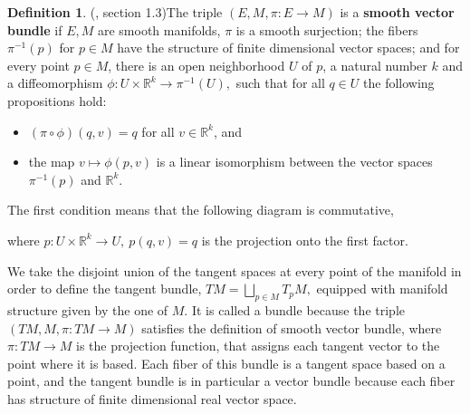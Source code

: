 \documentclass[12pt, letterpaper, reqno]{amsart}
\theoremstyle{definition}
\newtheorem{df}{Definition}
\theoremstyle{plain}
\theoremstyle{remark}
\begin{document}
\begin{df}(\cite{luke2013vector}, section 1.3)\label{def:smooth_vector_bundle}
	The triple $ (E, M, \pi: E \rightarrow {M}) $ is a \textbf{smooth vector bundle} if $ E,M $ are smooth manifolds, $ \pi $ is a smooth surjection; the fibers $ \pi^{-1}(p) $ for $ p\in M $  have the structure of finite dimensional vector spaces; and for every point $ p\in M $, there is an open neighborhood $ U $ of $ p $, a natural number $ k $ and a diffeomorphism $ \phi: U\times \mathbb{R}^k \rightarrow  \pi^{-1}(U),$ such that for all $ q\in U $ the following propositions hold:  

	\begin{itemize}
		\item $ (\pi\circ \phi)(q,v)=q $ for all $ v\in \mathbb{R}^k $, and  
		\item the map $ v \mapsto \phi(p,v) $ is a linear isomorphism between the vector spaces $\pi^{-1}(p) $ and $ \mathbb{R}^k. $     
	\end{itemize}
	The first condition means that the following diagram is commutative,	
	\begin{center}
	\end{center}
	where $ p:U\times \mathbb{R}^k \rightarrow U, \ p(q,v)=q$ is the projection onto the first factor.
\end{df}
We take the disjoint union of the tangent spaces at every point of the manifold in order to define the tangent bundle,
$ TM = \bigsqcup_{p\in M} T_pM, $ 
equipped with manifold structure given by the one of $ M. $ It is called a bundle because the triple $ (TM, M,\pi:TM \rightarrow {M}) $ satisfies the definition of smooth vector bundle, where $ \pi:TM \rightarrow {M} $  is the projection function, that assigns each tangent vector to the point where it is based. Each fiber of this bundle is a tangent space based on a point, and the tangent bundle is in particular a vector bundle because each fiber has structure of finite dimensional real vector space.
\end{document}

